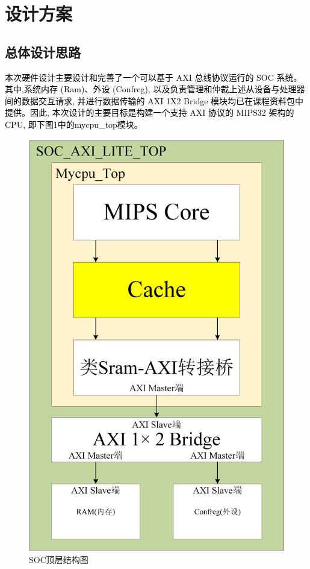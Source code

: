 \section{设计方案}
\subsection{总体设计思路}
\textcolor{black}{本次硬件设计主要设计和完善了一个可以基于 AXI 总线协议运行的 SOC 系统。其中,系统内存 (Ram)、外设 (Confreg), 以及负责管理和仲裁上述从设备与处理器间的数据交互请求, 并进行数据传输的 AXI 1X2 Bridge 模块均已在课程资料包中提供。因此, 本次设计的主要目标是构建一个支持 AXI 协议的 MIPS32 架构的 CPU, 即下图1中的mycpu\_top模块。}
\begin{figure}
	\centering
	\includegraphics[width=0.5\linewidth]{image/p14.png}
	\caption{SOC顶层结构图}
	\label{fig:enter-label}
\end{figure}

